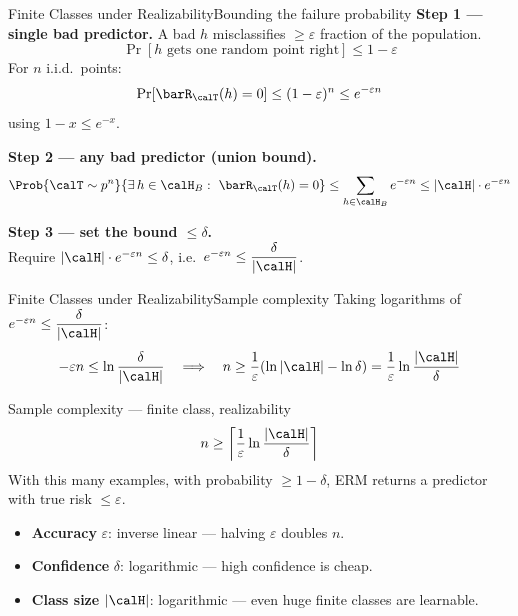 \begin{frame}{Finite Classes under Realizability}{Bounding the failure probability}
  \textbf{Step 1 — single bad predictor.}
  A bad $h$ misclassifies $\geq \varepsilon$ fraction of the population.
  \[
    \Pr[\text{$h$ gets one random point right}] \leq 1-\varepsilon
  \]
  For $n$ i.i.d.\ points:
  \[
    \Pr[\barR_\calT(h) = 0] \leq (1-\varepsilon)^n \leq e^{-\varepsilon n}
  \]
  using $1-x \leq e^{-x}$.

  \medskip
  \textbf{Step 2 — any bad predictor (union bound).}
  \[
    \Prob{\calT \sim p^n}{\exists\, h \in \calH_B :\ \barR_\calT(h) = 0}
    \leq \sum_{h \in \calH_B} e^{-\varepsilon n}
    \leq |\calH| \cdot e^{-\varepsilon n}
  \]

  \medskip
  \textbf{Step 3 — set the bound $\leq \delta$.}\\
  Require $|\calH| \cdot e^{-\varepsilon n} \leq \delta$, i.e.\ $e^{-\varepsilon n} \leq
  \dfrac{\delta}{|\calH|}$.
\end{frame}

\begin{frame}{Finite Classes under Realizability}{Sample complexity}
  Taking logarithms of $e^{-\varepsilon n} \leq \dfrac{\delta}{|\calH|}$:
  \[
    -\varepsilon n \leq \ln\frac{\delta}{|\calH|}
    \quad\Longrightarrow\quad
    n \geq \frac{1}{\varepsilon}\!\left(\ln|\calH| - \ln\delta\right)
    = \frac{1}{\varepsilon}\ln\frac{|\calH|}{\delta}
  \]
  \begin{block}{Sample complexity — finite class, realizability}
    \[
      n \geq \left\lceil \frac{1}{\varepsilon}\ln\frac{|\calH|}{\delta} \right\rceil
    \]
    With this many examples, with probability $\geq 1-\delta$, ERM returns a predictor
    with true risk $\leq \varepsilon$.
  \end{block}
  \bigskip
  \begin{itemize}
    \item \textbf{Accuracy} $\varepsilon$: inverse linear — halving $\varepsilon$ doubles $n$.
    \item \textbf{Confidence} $\delta$: logarithmic — high confidence is cheap.
    \item \textbf{Class size} $|\calH|$: logarithmic — even huge finite classes are
          learnable.
  \end{itemize}
\end{frame}


